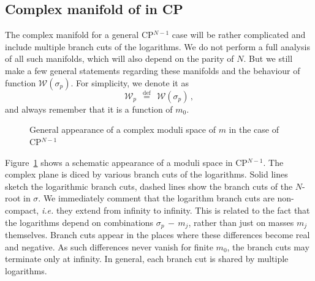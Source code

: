 \documentclass[epsfig,12pt]{article}
\def\beq{\begin{equation}}
\def\eeq{\end{equation}}
\def\beq{\begin{equation}}
\def\eeq{\end{equation}}
\newcommand{\W}{\mathcal{W}}
\begin{document}
\subsection{Complex manifold of  in CP}

	The  complex manifold for a general CP$^{N-1}$ case will be rather complicated and include
	multiple branch cuts of the logarithms.
	We do not perform a full analysis of all such manifolds, which will also depend on 
	the parity of $ N $.
	But we still make a few general statements regarding these manifolds and the behaviour of function $ \W(\sigma_p) $.
	For simplicity, we denote it as
\beq
	\W_p ~~\stackrel{\text{def}}{=} ~~ \W(\sigma_p)\,,
\eeq
	and always remember that it is a function of $ m_0 $.

\begin{figure}
\begin{center}
\epsfxsize=8.0cm
\caption{General appearance of a complex moduli space of $ m $ in the case of CP$^{N-1}$}
\label{fcpn}
\end{center}
\end{figure}
	Figure~\ref{fcpn} shows a schematic appearance of a moduli space in CP$^{N-1}$.
	The complex plane is diced by various branch cuts of the logarithms.
	Solid lines sketch the logarithmic branch cuts, dashed lines show the branch cuts of the $N$-root in $\sigma$.
	We immediately comment that the logarithm branch cuts are non-compact, 
	{\it i.e.} they extend from infinity to infinity.
	This is related to the fact that the logarithms depend on combinations $ \sigma_p \,-\, m_j $,
	rather than just on masses $ m_j $ themselves.
	Branch cuts appear in the places where these differences become real and negative.
	As such differences never vanish for finite $ m_0 $, the branch cuts may terminate only at infinity. 
	In general, each branch cut is shared by multiple logarithms.
\end{document}
